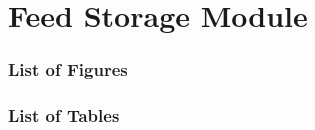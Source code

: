 \part{Feed Storage Module}
\thispagestyle{fancy}

\localtableofcontents
\clearpage

\section*{List of Figures}
\locallistoffigures
\newpage

\section*{List of Tables}
\locallistoftables
\newpage

